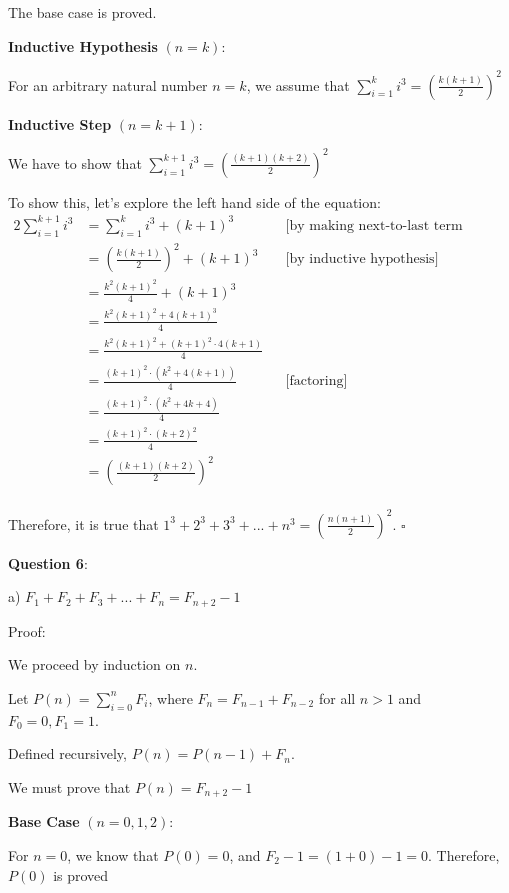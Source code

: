 \documentclass{article} %
\newcommand{\question}[2][]{\begin{flushleft}
        \textbf{Question #1}: \text{#2}

\end{flushleft}}
\begin{document}
    The base case is proved.

    \textbf{Inductive Hypothesis} $(n = k)$:

    For an arbitrary natural number $n = k$, we assume that $\sum_{i = 1}^k i^3 = (\frac{k(k+1)}{2})^2$

    \textbf{Inductive Step} $(n = k + 1)$:

    We have to show that $\sum_{i = 1}^{k + 1} i^3 = (\frac{(k + 1)(k + 2)}{2})^2$

    To show this, let's explore the left hand side of the equation:
    \begin{alignat*}{2}
        \sum_{i = 1}^{k + 1} i^3 &= \sum_{i = 1}^{k} i^3 + (k + 1)^3 &&\text{[by making next-to-last term explicit]}\\
        &= \left(\frac{k(k+1)}{2}\right)^2 + (k + 1)^3 &&\text{[by inductive hypothesis]}\\
        &= \frac{k^2(k+1)^2}{4} + (k + 1)^3\\
        &= \frac{k^2(k+1)^2+ 4(k + 1)^3}{4}\\
        &= \frac{k^2(k+1)^2+ (k + 1)^2 \cdot 4(k + 1)}{4}\\
        &= \frac{(k + 1)^2 \cdot (k^2 + 4(k + 1))}{4} &&\text{[factoring]}\\
        &= \frac{(k + 1)^2 \cdot (k^2 + 4k + 4)}{4}\\
        &= \frac{(k + 1)^2 \cdot (k + 2)^2}{4}\\
        &= \left(\frac{(k + 1)(k+2)}{2}\right) ^2\\
    \end{alignat*}

    Therefore, it is true that $1^3 + 2^3 + 3^3 + ... + n^3 = (\frac{n(n+1)}{2})^2$. $\square$

    \newpage

    \question[6]{}

    a) $F_1 + F_2 + F_3 + ... + F_n = F_{n + 2} - 1$

    Proof: 
    
    We proceed by induction on $n$.

    Let $P(n) = \sum_{i = 0}^{n} F_i$, where $F_n = F_{n - 1} + F_{n - 2}$ for all $n > 1$ and $F_0 = 0, F_1 = 1$.

    Defined recursively, $P(n) = P(n - 1) + F_n$.

    We must prove that $P(n) = F_{n + 2} - 1$

    \textbf{Base Case} $(n = 0, 1, 2)$:

    For $n = 0$, we know that $P(0) = 0$, and $F_2 - 1 = (1 + 0) - 1 = 0$. Therefore, $P(0)$ is proved
\end{document}
